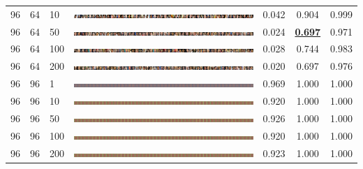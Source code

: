 \documentclass[a4paper]{article}
\begin{document}
\begin{table}[h!]
\begin{center}
{\begin{tabular}{lllcccc}
      96 & 64 & 10  & \includegraphics[width=\textwidth,trim={1536px 0 0 0},clip]{figures/faces_g96_d64_ep10_generator.jpg}   & 0.042 & 0.904 & 0.999\\
      96 & 64 & 50  & \includegraphics[width=\textwidth,trim={1536px 0 0 0},clip]{figures/faces_g96_d64_ep50_generator.jpg}   & 0.024 & \underline{\bf 0.697} & 0.971\\
      96 & 64 & 100 & \includegraphics[width=\textwidth,trim={1536px 0 0 0},clip]{figures/faces_g96_d64_ep100_generator.jpg}  & 0.028 & 0.744 & 0.983\\
      96 & 64 & 200 & \includegraphics[width=\textwidth,trim={1536px 0 0 0},clip]{figures/faces_g96_d64_ep200_generator.jpg}  & 0.020 & 0.697 & 0.976\\
      \hline
      96 & 96 & 1   & \includegraphics[width=\textwidth,trim={1536px 0 0 0},clip]{figures/faces_g96_d96_ep1_generator.jpg}    & 0.969 & 1.000 & 1.000\\
      96 & 96 & 10  & \includegraphics[width=\textwidth,trim={1536px 0 0 0},clip]{figures/faces_g96_d96_ep10_generator.jpg}   & 0.920 & 1.000 & 1.000\\
      96 & 96 & 50  & \includegraphics[width=\textwidth,trim={1536px 0 0 0},clip]{figures/faces_g96_d96_ep50_generator.jpg}   & 0.926 & 1.000 & 1.000\\
      96 & 96 & 100 & \includegraphics[width=\textwidth,trim={1536px 0 0 0},clip]{figures/faces_g96_d96_ep100_generator.jpg}  & 0.920 & 1.000 & 1.000\\
      96 & 96 & 200 & \includegraphics[width=\textwidth,trim={1536px 0 0 0},clip]{figures/faces_g96_d96_ep200_generator.jpg}  & 0.923 & 1.000 & 1.000\\

\end{tabular}}
\end{center}
\end{table}
\end{document}
